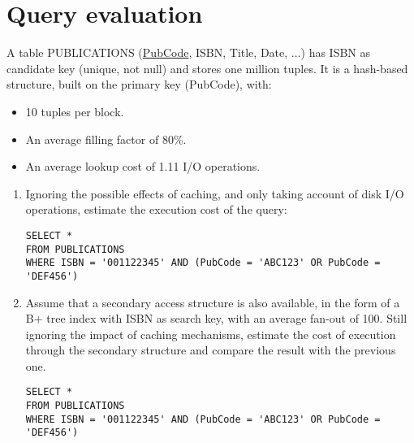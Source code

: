 \section{Query evaluation}

A table
PUBLICATIONS (\underline{PubCode}, ISBN, Title, Date, $\dots$)
has ISBN as candidate key (unique, not null) and stores one million tuples.
It is a hash-based structure, built on the primary key (PubCode), with:
\begin{itemize}
    \item 10 tuples per block. 
    \item An average filling factor of 80\%. 
    \item An average lookup cost of 1.11 I/O operations. 
\end{itemize}
\begin{enumerate}
    \item Ignoring the possible effects of caching, and only taking account of disk I/O operations, estimate the execution cost of the query:
        \begin{lstlisting}[style=SQL]
SELECT *
FROM PUBLICATIONS
WHERE ISBN = '001122345' AND (PubCode = 'ABC123' OR PubCode = 'DEF456')
        \end{lstlisting}
    \item Assume that a secondary access structure is also available, in the form of a B+ tree index with ISBN as search key, with an average fan-out of 100.
        Still ignoring the impact of caching mechanisms, estimate the cost of execution through the secondary structure and compare the result with the previous one.
        \begin{lstlisting}[style=SQL]
SELECT * 
FROM PUBLICATIONS
WHERE ISBN = '001122345' AND (PubCode = 'ABC123' OR PubCode = 'DEF456')
        \end{lstlisting}
\end{enumerate}

